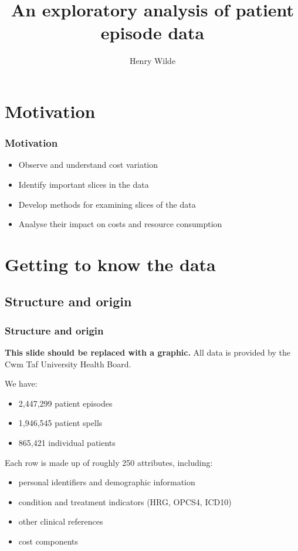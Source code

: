 \documentclass{beamer}
\title{An exploratory analysis of patient episode data}
\author{Henry Wilde}
\institute{Cardiff University School of Mathematics}
\begin{document}
\begin{frame}
\titlepage%
\end{frame}


\section{Motivation}

\begin{frame}
\frametitle{Motivation}

\begin{itemize}
    \item Observe and understand cost variation
    \item Identify important slices in the data
    \item Develop methods for examining slices of the data
    \item Analyse their impact on costs and resource consumption
\end{itemize}
\end{frame}

\section{Getting to know the data}

\subsection{Structure and origin}
\begin{frame}
    \frametitle{Structure and origin}
    \textbf{This slide should be replaced with a graphic.}
    \pause%
    All data is provided by the Cwm Taf University Health Board.
    \vspace{10pt}

    \pause%
    We have:
    \begin{itemize}
        \item 2,447,299 patient episodes
        \item 1,946,545 patient spells
        \item 865,421 individual patients
    \end{itemize}
    \vspace{10pt}

    \pause%
    Each row is made up of roughly 250 attributes, including:
    \begin{itemize}
        \pause%
        \item personal identifiers and demographic information
        \pause%
        \item condition and treatment indicators (HRG, OPCS4, ICD10)
        \pause%
        \item other clinical references
        \pause%
        \item cost components
    \end{itemize}
\end{frame}
\end{document}
